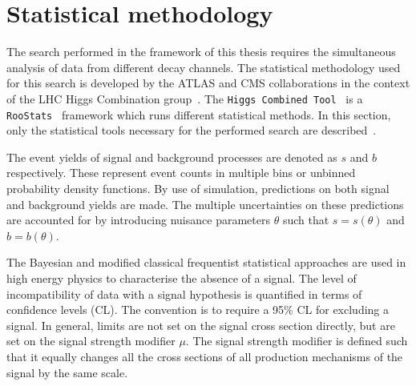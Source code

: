 \section{Statistical methodology}
\label{sec:Stat}
The search performed in the framework of this thesis requires the simultaneous analysis of data from different decay channels. The statistical methodology used for this search is developed by the ATLAS and CMS collaborations in the context of the LHC Higgs Combination group~\cite{Chatrchyan:2012tx,Cowan:2010js,CMS-PAS-HIG-12-020,CMS-NOTE-2011-005}. The \texttt{Higgs Combined Tool}~\cite{HiggsCombine} is a 
\texttt{RooStats}~\cite{Moneta:2010pm} framework which runs different statistical methods. In this section, only the statistical tools necessary for the performed search are described~\cite{CLs}.

The event yields of signal and background processes are denoted as $s$ and $b$ respectively. These represent event counts in multiple bins or unbinned probability density functions. By use of simulation, predictions on both signal and background yields are made. The multiple uncertainties on these predictions are accounted for by introducing nuisance parameters $\theta$ such that $s = s(\theta)$ and $b=b(\theta)$.%

The Bayesian and modified classical frequentist statistical approaches are used in high energy physics to characterise the absence of a signal.  The level of incompatibility of data with a signal hypothesis is quantified in terms of confidence levels (CL). The convention is to require a 95\% CL for excluding a signal. In general, limits are not set on the signal cross section directly, but are set on the signal strength modifier $\mu$. The signal strength modifier is defined such that it equally changes all the cross sections of all production mechanisms of the signal by the same scale.  



